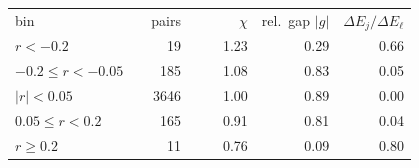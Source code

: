 \begin{table}[!htb]
\begin{tabular}{llrrrrrrr}
bin & & pairs & & & $\chi$ & \multicolumn{2}{r}{rel.\ gap $|g|$} & $\Delta E_j/\Delta E_\ell$ \\
$r<-0.2$ & & 19 & & & 1.23 & \multicolumn{2}{r}{0.29} & 0.66 \\
$-0.2\le r<-0.05$ & & 185 & & & 1.08 & \multicolumn{2}{r}{0.83} & 0.05 \\
$|r|<0.05$ & & 3646 & & & 1.00 & \multicolumn{2}{r}{0.89} & 0.00 \\
$0.05\le r<0.2$ & & 165 & & & 0.91 & \multicolumn{2}{r}{0.81} & 0.04 \\
$r\ge0.2$ & & 11 & & & 0.76 & \multicolumn{2}{r}{0.09} & 0.80 \\
\bottomrule
\end{tabular}
\end{table}
